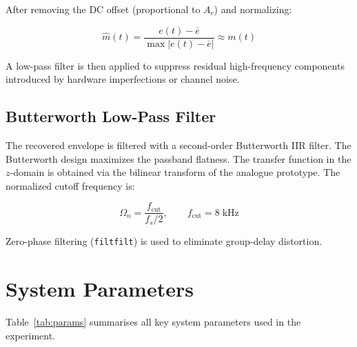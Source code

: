 \documentclass[12pt,a4paper]{article}
\begin{document}
After removing the DC offset (proportional to $A_c$) and normalizing:

\begin{equation}
  \hat{m}(t) = \frac{e(t) - \overline{e}}{\max|e(t) - \overline{e}|}
    \approx m(t)
\end{equation}

A low-pass filter is then applied to suppress residual high-frequency components
introduced by hardware imperfections or channel noise.

\subsection{Butterworth Low-Pass Filter}

The recovered envelope is filtered with a second-order Butterworth IIR filter.
The Butterworth design maximizes the passband flatness.  The transfer function in
the $z$-domain is obtained via the bilinear transform of the analogue prototype.
The normalized cutoff frequency is:

\begin{equation}
  \Omega_n = \frac{f_{\mathrm{cut}}}{f_s/2}, \qquad f_{\mathrm{cut}} = 8\;\text{kHz}
\end{equation}

Zero-phase filtering (\texttt{filtfilt}) is used to eliminate group-delay
distortion.

\section{System Parameters}

Table~\ref{tab:params} summarises all key system parameters used in the
experiment.
\end{document}
